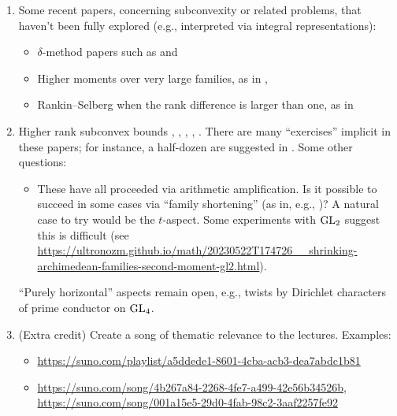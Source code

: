 \documentclass[reqno]{amsart} 
\begin{document}
\begin{enumerate}
\item Some recent papers, concerning subconvexity or related problems, that haven't been fully explored (e.g., interpreted via integral representations):
  \begin{itemize}
  \item $\delta$-method papers such as \cite{MR4416133} and \cite{2022arXiv2206.06517}
  \item Higher moments over very large families, as in \cite{MR4216694}, \cite{MR4067357}
  \item Rankin--Selberg when the rank difference is larger than one, as in \cite{MR3996341}
  \end{itemize}

\item Higher rank subconvex bounds \cite{MR4203038}, \cite{2023arXiv2309.16667}, \cite{2020arXiv201202187N}, \cite{2021arXiv210915230N}, \cite{2023arXiv2309.06314}.  There are many ``exercises'' implicit in these papers; for instance, a half-dozen are suggested in \cite[Remark 1.4]{2020arXiv201202187N}.  Some other questions:
  \begin{itemize}
  \item These have all proceeded via arithmetic amplification.  Is it possible to succeed in some cases via ``family shortening'' (as in, e.g., \cite{Sar01})?  A natural case to try would be the $t$-aspect.  Some experiments with $\operatorname{GL}_2$ suggest this is difficult (see \url{https://ultronozm.github.io/math/20230522T174726__shrinking-archimedean-families-second-moment-gl2.html}).
  \end{itemize} ``Purely horizontal'' aspects remain open, e.g., twists by Dirichlet characters of prime conductor on $\operatorname{GL}_4$.

\item (Extra credit) Create a song of thematic relevance to the lectures.  Examples:
  \begin{itemize}
  \item \url{https://suno.com/playlist/a5ddede1-8601-4cba-acb3-dea7abdc1b81}
  \item \url{https://suno.com/song/4b267a84-2268-4fe7-a499-42e56b34526b}, \url{https://suno.com/song/001a15e5-29d0-4fab-98c2-3aaf2257fe92}
  \end{itemize}
\end{enumerate}

{} 
\end{document}
